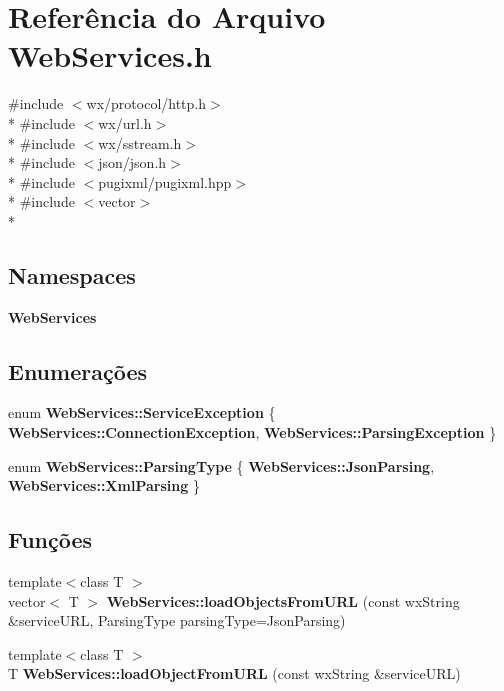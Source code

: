 \section{Referência do Arquivo Web\+Services.\+h}
\label{_web_services_8h}
{\ttfamily \#include $<$wx/protocol/http.\+h$>$}\\*
{\ttfamily \#include $<$wx/url.\+h$>$}\\*
{\ttfamily \#include $<$wx/sstream.\+h$>$}\\*
{\ttfamily \#include $<$json/json.\+h$>$}\\*
{\ttfamily \#include $<$pugixml/pugixml.\+hpp$>$}\\*
{\ttfamily \#include $<$vector$>$}\\*
\subsection*{Namespaces}
\begin{DoxyCompactItemize}
\item 
 {\bf Web\+Services}
\end{DoxyCompactItemize}
\subsection*{Enumerações}
\begin{DoxyCompactItemize}
\item 
enum {\bf Web\+Services\+::\+Service\+Exception} \{ {\bf Web\+Services\+::\+Connection\+Exception}, 
{\bf Web\+Services\+::\+Parsing\+Exception}
 \}
\item 
enum {\bf Web\+Services\+::\+Parsing\+Type} \{ {\bf Web\+Services\+::\+Json\+Parsing}, 
{\bf Web\+Services\+::\+Xml\+Parsing}
 \}
\end{DoxyCompactItemize}
\subsection*{Funções}
\begin{DoxyCompactItemize}
\item 
{\footnotesize template$<$class T $>$ }\\vector$<$ T $>$ {\bf Web\+Services\+::load\+Objects\+From\+U\+RL} (const wx\+String \&service\+U\+RL, Parsing\+Type parsing\+Type=Json\+Parsing)
\item 
{\footnotesize template$<$class T $>$ }\\T {\bf Web\+Services\+::load\+Object\+From\+U\+RL} (const wx\+String \&service\+U\+RL)
\end{DoxyCompactItemize}
